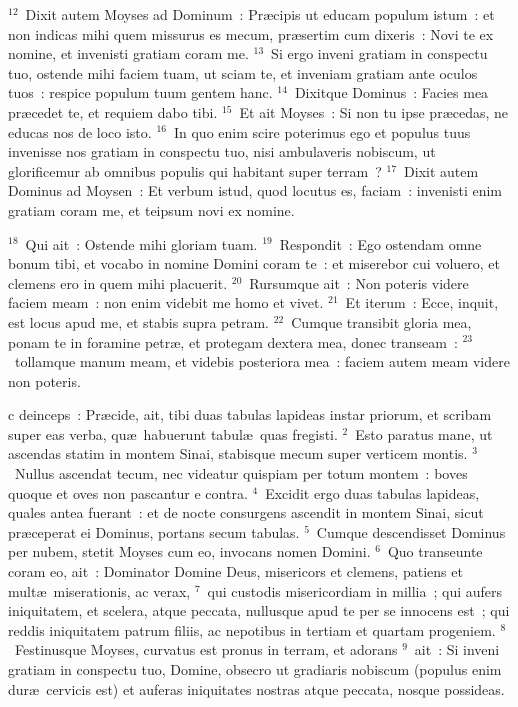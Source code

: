 ${}^{12}$~Dixit autem Moyses ad Dominum~: Pr\ae cipis ut educam populum istum~: et non indicas mihi quem missurus es mecum, pr\ae sertim cum dixeris~: Novi te ex nomine, et invenisti gratiam coram me.
${}^{13}$~Si ergo inveni gratiam in conspectu tuo, ostende mihi faciem tuam, ut sciam te, et inveniam gratiam ante oculos tuos~: respice populum tuum gentem hanc.
${}^{14}$~Dixitque Dominus~: Facies mea pr\ae cedet te, et requiem dabo tibi.
${}^{15}$~Et ait Moyses~: Si non tu ipse pr\ae cedas, ne educas nos de loco isto.
${}^{16}$~In quo enim scire poterimus ego et populus tuus invenisse nos gratiam in conspectu tuo, nisi ambulaveris nobiscum, ut glorificemur ab omnibus populis qui habitant super terram~?
${}^{17}$~Dixit autem Dominus ad Moysen~: Et verbum istud, quod locutus es, faciam~: invenisti enim gratiam coram me, et teipsum novi ex nomine.


${}^{18}$~Qui ait~: Ostende mihi gloriam tuam.
${}^{19}$~Respondit~: Ego ostendam omne bonum tibi, et vocabo in nomine Domini coram te~: et miserebor cui voluero, et clemens ero in quem mihi placuerit.
${}^{20}$~Rursumque ait~: Non poteris videre faciem meam~: non enim videbit me homo et vivet.
${}^{21}$~Et iterum~: Ecce, inquit, est locus apud me, et stabis supra petram.
${}^{22}$~Cumque transibit gloria mea, ponam te in foramine petr\ae , et protegam dextera mea, donec transeam~:
${}^{23}$~tollamque manum meam, et videbis posteriora mea~: faciem autem meam videre non poteris.

\bchapter
{}c deinceps~: Pr\ae cide, ait, tibi duas tabulas lapideas instar priorum, et scribam super eas verba, qu\ae\ habuerunt tabul\ae\ quas fregisti.
${}^{2}$~Esto paratus mane, ut ascendas statim in montem Sinai, stabisque mecum super verticem montis.
${}^{3}$~Nullus ascendat tecum, nec videatur quispiam per totum montem~: boves quoque et oves non pascantur e contra.
${}^{4}$~Excidit ergo duas tabulas lapideas, quales antea fuerant~: et de nocte consurgens ascendit in montem Sinai, sicut pr\ae ceperat ei Dominus, portans secum tabulas.
${}^{5}$~Cumque descendisset Dominus per nubem, stetit Moyses cum eo, invocans nomen Domini.
${}^{6}$~Quo transeunte coram eo, ait~: Dominator Domine Deus, misericors et clemens, patiens et mult\ae\ miserationis, ac verax,
${}^{7}$~qui custodis misericordiam in millia~; qui aufers iniquitatem, et scelera, atque peccata, nullusque apud te per se innocens est~; qui reddis iniquitatem patrum filiis, ac nepotibus in tertiam et quartam progeniem.
${}^{8}$~Festinusque Moyses, curvatus est pronus in terram, et adorans
${}^{9}$~ait~: Si inveni gratiam in conspectu tuo, Domine, obsecro ut gradiaris nobiscum (populus enim dur\ae\ cervicis est) et auferas iniquitates nostras atque peccata, nosque possideas.


